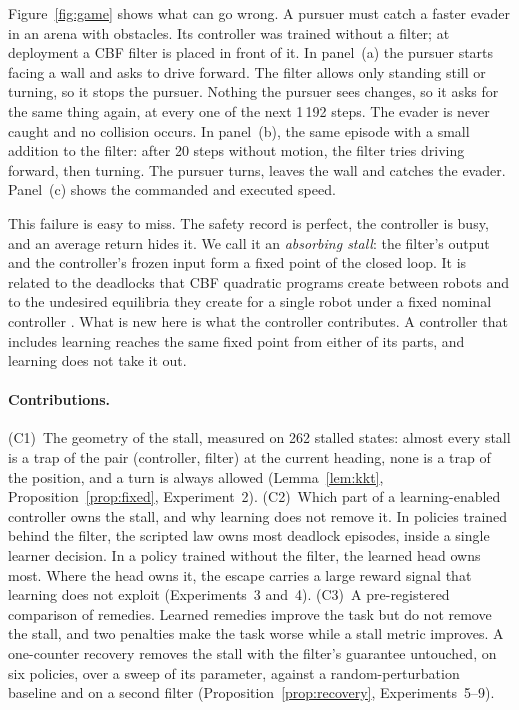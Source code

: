 \documentclass{l4dc2027}
\begin{document}
Figure~\ref{fig:game} shows what can go wrong. A pursuer must catch a faster evader in an arena with obstacles. Its controller was trained without a filter; at deployment a CBF filter is placed in front of it. In panel~(a) the pursuer starts facing a wall and asks to drive forward. The filter allows only standing still or turning, so it stops the pursuer. Nothing the pursuer sees changes, so it asks for the same thing again, at every one of the next 1\,192 steps. The evader is never caught and no collision occurs. In panel~(b), the same episode with a small addition to the filter: after 20 steps without motion, the filter tries driving forward, then turning. The pursuer turns, leaves the wall and catches the evader. Panel~(c) shows the commanded and executed speed.

This failure is easy to miss. The safety record is perfect, the controller is busy, and an average return hides it. We call it an \emph{absorbing stall}: the filter's output and the controller's frozen input form a fixed point of the closed loop. It is related to the deadlocks that CBF quadratic programs create between robots \citep{grover2020symmetry,grover2021deadlock,grover2023before} and to the undesired equilibria they create for a single robot under a fixed nominal controller \citep{reis2021cbfqp,tan2024undesired}. What is new here is what the controller contributes. A controller that includes learning reaches the same fixed point from either of its parts, and learning does not take it out.

\paragraph{Contributions.}
(C1)~The geometry of the stall, measured on 262 stalled states: almost every stall is a trap of the pair (controller, filter) at the current heading, none is a trap of the position, and a turn is always allowed (Lemma~\ref{lem:kkt}, Proposition~\ref{prop:fixed}, Experiment~2).
(C2)~Which part of a learning-enabled controller owns the stall, and why learning does not remove it. In policies trained behind the filter, the scripted law owns most deadlock episodes, inside a single learner decision. In a policy trained without the filter, the learned head owns most. Where the head owns it, the escape carries a large reward signal that learning does not exploit (Experiments~3 and~4).
(C3)~A pre-registered comparison of remedies. Learned remedies improve the task but do not remove the stall, and two penalties make the task worse while a stall metric improves. A one-counter recovery removes the stall with the filter's guarantee untouched, on six policies, over a sweep of its parameter, against a random-perturbation baseline and on a second filter (Proposition~\ref{prop:recovery}, Experiments~5--9).
\end{document}

